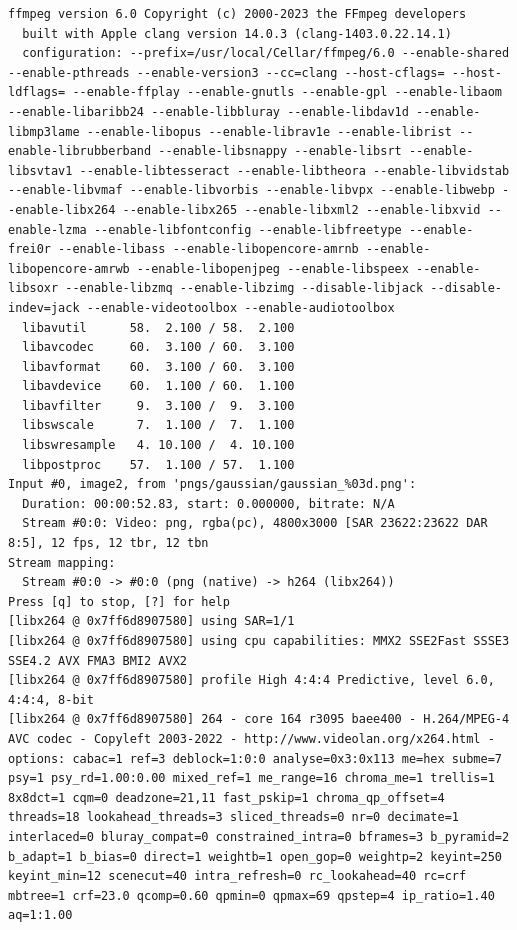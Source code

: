 \documentclass[
  letterpaper,
  DIV=11,
  numbers=noendperiod,
  oneside]{scrreprt}
\begin{document}
\begin{verbatim}
ffmpeg version 6.0 Copyright (c) 2000-2023 the FFmpeg developers
  built with Apple clang version 14.0.3 (clang-1403.0.22.14.1)
  configuration: --prefix=/usr/local/Cellar/ffmpeg/6.0 --enable-shared --enable-pthreads --enable-version3 --cc=clang --host-cflags= --host-ldflags= --enable-ffplay --enable-gnutls --enable-gpl --enable-libaom --enable-libaribb24 --enable-libbluray --enable-libdav1d --enable-libmp3lame --enable-libopus --enable-librav1e --enable-librist --enable-librubberband --enable-libsnappy --enable-libsrt --enable-libsvtav1 --enable-libtesseract --enable-libtheora --enable-libvidstab --enable-libvmaf --enable-libvorbis --enable-libvpx --enable-libwebp --enable-libx264 --enable-libx265 --enable-libxml2 --enable-libxvid --enable-lzma --enable-libfontconfig --enable-libfreetype --enable-frei0r --enable-libass --enable-libopencore-amrnb --enable-libopencore-amrwb --enable-libopenjpeg --enable-libspeex --enable-libsoxr --enable-libzmq --enable-libzimg --disable-libjack --disable-indev=jack --enable-videotoolbox --enable-audiotoolbox
  libavutil      58.  2.100 / 58.  2.100
  libavcodec     60.  3.100 / 60.  3.100
  libavformat    60.  3.100 / 60.  3.100
  libavdevice    60.  1.100 / 60.  1.100
  libavfilter     9.  3.100 /  9.  3.100
  libswscale      7.  1.100 /  7.  1.100
  libswresample   4. 10.100 /  4. 10.100
  libpostproc    57.  1.100 / 57.  1.100
Input #0, image2, from 'pngs/gaussian/gaussian_%03d.png':
  Duration: 00:00:52.83, start: 0.000000, bitrate: N/A
  Stream #0:0: Video: png, rgba(pc), 4800x3000 [SAR 23622:23622 DAR 8:5], 12 fps, 12 tbr, 12 tbn
Stream mapping:
  Stream #0:0 -> #0:0 (png (native) -> h264 (libx264))
Press [q] to stop, [?] for help
[libx264 @ 0x7ff6d8907580] using SAR=1/1
[libx264 @ 0x7ff6d8907580] using cpu capabilities: MMX2 SSE2Fast SSSE3 SSE4.2 AVX FMA3 BMI2 AVX2
[libx264 @ 0x7ff6d8907580] profile High 4:4:4 Predictive, level 6.0, 4:4:4, 8-bit
[libx264 @ 0x7ff6d8907580] 264 - core 164 r3095 baee400 - H.264/MPEG-4 AVC codec - Copyleft 2003-2022 - http://www.videolan.org/x264.html - options: cabac=1 ref=3 deblock=1:0:0 analyse=0x3:0x113 me=hex subme=7 psy=1 psy_rd=1.00:0.00 mixed_ref=1 me_range=16 chroma_me=1 trellis=1 8x8dct=1 cqm=0 deadzone=21,11 fast_pskip=1 chroma_qp_offset=4 threads=18 lookahead_threads=3 sliced_threads=0 nr=0 decimate=1 interlaced=0 bluray_compat=0 constrained_intra=0 bframes=3 b_pyramid=2 b_adapt=1 b_bias=0 direct=1 weightb=1 open_gop=0 weightp=2 keyint=250 keyint_min=12 scenecut=40 intra_refresh=0 rc_lookahead=40 rc=crf mbtree=1 crf=23.0 qcomp=0.60 qpmin=0 qpmax=69 qpstep=4 ip_ratio=1.40 aq=1:1.00

\end{verbatim}
\end{document}
